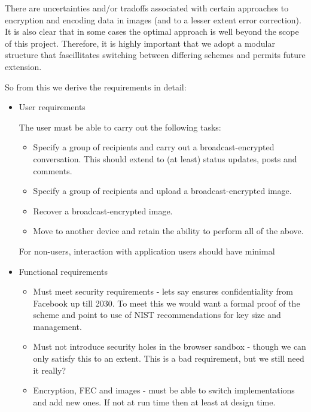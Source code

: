     There are uncertainties and/or tradoffs associated with certain approaches to encryption and encoding data in images (and to a lesser extent error correction). It is also clear that in some cases the optimal approach is well beyond the scope of this project. Therefore, it is highly important that we adopt a modular structure that fascillitates switching between differing schemes and permits future extension.
    
    So from this we derive the requirements in detail:
    
    \begin{itemize}
    
        \item User requirements
        
        The user must be able to carry out the following tasks:
        \begin{itemize}
            \item Specify a group of recipients and carry out a broadcast-encrypted conversation. This should extend to (at least) status updates, posts and comments.
            \item Specify a group of recipients and upload a broadcast-encrypted image.
            \item Recover a broadcast-encrypted image.
            \item Move to another device and retain the ability to perform all of the above.
        \end{itemize}
        
        For non-users, interaction with application users should have minimal 
        
        \item Functional requirements
        
        \begin{itemize}
            \item Must meet security requirements - lets say ensures confidentiality from Facebook up till 2030. To meet this we would want a formal proof of the scheme and point to use of NIST recommendations for key size and management.
            \item Must not introduce security holes in the browser sandbox - though we can only satisfy this to an extent. This is a bad requirement, but we still need it really?
            \item Encryption, FEC and images - must be able to switch implementations and add new ones. If not at run time then at least at design time.
        \end{itemize}
            

\end{itemize}
